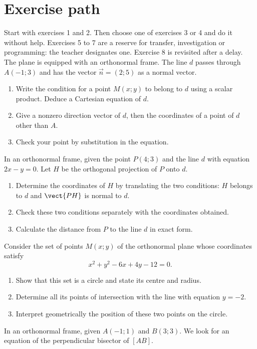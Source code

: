 \section*{Exercise path}\label{C07-PARC}
Start with exercises 1 and 2. Then choose one of exercises 3 or 4 and do it without help. Exercises 5 to 7 are a reserve for transfer, investigation or programming: the teacher designates one. Exercise 8 is revisited after a delay.
\begingroup
{}
The plane is equipped with an orthonormal frame. The line $d$ passes through $A(-1;3)$ and has the vector $\vec n=(2;5)$ as a normal vector.
\begin{enumerate}[label=\arabic*.]
\item Write the condition for a point $M(x;y)$ to belong to $d$ using a scalar product. Deduce a Cartesian equation of $d$.
\item Give a nonzero direction vector of $d$, then the coordinates of a point of $d$ other than $A$.
\item Check your point by substitution in the equation.
\end{enumerate}
In an orthonormal frame, given the point $P(4;3)$ and the line $d$ with equation $2x-y=0$. Let $H$ be the orthogonal projection of $P$ onto $d$.
\begin{enumerate}[label=\arabic*.]
\item Determine the coordinates of $H$ by translating the two conditions: $H$ belongs to $d$ and $\vect{PH}$ is normal to $d$.
\item Check these two conditions separately with the coordinates obtained.
\item Calculate the distance from $P$ to the line $d$ in exact form.
\end{enumerate}
Consider the set of points $M(x;y)$ of the orthonormal plane whose coordinates satisfy\[x^2+y^2-6x+4y-12=0.\]
\begin{enumerate}[label=\arabic*.]
\item Show that this set is a circle and state its centre and radius.
\item Determine all its points of intersection with the line with equation $y=-2$.
\item Interpret geometrically the position of these two points on the circle.
\end{enumerate}
In an orthonormal frame, given $A(-1;1)$ and $B(3;3)$. We look for an equation of the perpendicular bisector of $[AB]$.
